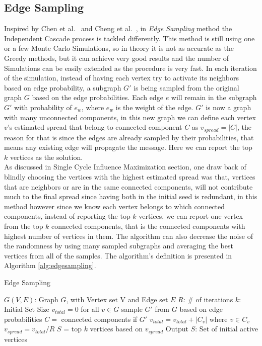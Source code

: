 \documentclass[english]{tktltiki}
\begin{document}
\subsection{Edge Sampling}
Inspired by Chen et al.\ \cite{chen09} and Cheng et al.\ \cite{cheng13}, in \textit{Edge Sampling} method the Independent Cascade process is tackled differently. This method is still using one or a few Monte Carlo Simulations, so in theory it is not as accurate as the Greedy methods, but it can achieve very good results and the number of Simulations can be easily extended as the procedure is very fast. In each iteration of the simulation, instead of having each vertex try to activate its neighbors based on edge probability, a subgraph $G'$ is being sampled from the original graph $G$ based on the edge probabilities. Each edge $e$ will remain in the subgraph $G'$ with probability of $e_w$, where $e_w$ is the weight of the edge. $G'$ is now a graph with many unconnected components, in this new graph we can define each vertex $v$'s estimated spread that belong to connected component $C$ as $v_{spread} = |C|$, the reason for that is since the edges are already sampled by their probabilities, that means any existing edge will propagate the message. Here we can report the top $k$ vertices as the solution. \\
As discussed in Single Cycle Influence Maximization section, one draw back of blindly choosing the vertices with the highest estimated spread was that, vertices that are neighbors or are in the same connected components, will not contribute much to the final spread since having both in the initial seed is redundant, in this method however since we know each vertex belongs to which connected components, instead of reporting the top $k$ vertices, we can report one vertex from the top $k$ connected components, that is the connected components with highest number of vertices in them. The algorithm can also decrease the noise of the randomness by using many sampled subgraphs and averaging the best vertices from all of the samples. The algorithm's definition is presented in Algorithm \ref{alg:edgesampling}.
\begin{algorithm}[ht!]
\caption{Edge Sampling}
\label{alg:edgesampling}
\begin{algorithmic}
\Require $G(V,E)$: Graph $G$, with Vertex set V and Edge set $E$
\Require $R$: \# of iterations
\Require $k$: Initial Set Size
\State $v_{total}=0$ for all $v \in G$
	\State sample $G'$ from $G$ based on edge probabilities
	\State $C =$ connected components if $G'$
       	\State $v_{total} = v_{total} + |C_v|$ where $v \in C_v$
	\EndFor
\EndFor
{}
	\State $v_{spread}=v_{total}/R$
\EndFor
\State $S$ = top $k$ vertices based on $v_{spread}$
\State Output $S$: Set of initial active vertices
\end{algorithmic}
\end{algorithm}
\end{document}
